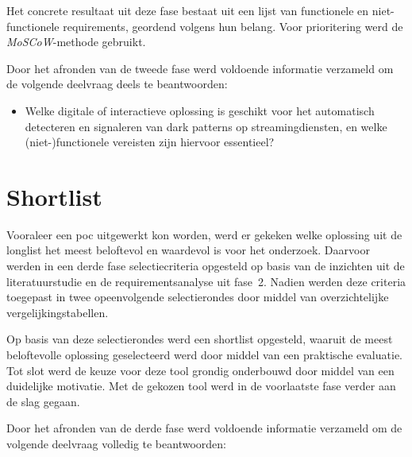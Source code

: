 \vspace{1em}

Het concrete resultaat uit deze fase bestaat uit een lijst van functionele en niet-functionele requirements, geordend volgens hun belang. Voor prioritering werd de \emph{MoSCoW}-methode gebruikt.

\vspace{1em}

Door het afronden van de tweede fase werd voldoende informatie verzameld om de volgende deelvraag deels te beantwoorden:

\begin{itemize}
    \item Welke digitale of interactieve oplossing is geschikt voor het automatisch detecteren en signaleren van dark patterns op streamingdiensten, en welke (niet-)functionele vereisten zijn hiervoor essentieel?
\end{itemize}

\vspace{1em}

\section{Shortlist}
\label{sec:shortlist}

\vspace{1em}

Vooraleer een \acrlong{poc} uitgewerkt kon worden, werd er gekeken welke oplossing uit de longlist het meest beloftevol en waardevol is voor het onderzoek. Daarvoor werden in een derde fase selectiecriteria opgesteld op basis van de inzichten uit de literatuurstudie en de requirementsanalyse uit fase~2. Nadien werden deze criteria toegepast in twee opeenvolgende selectierondes door middel van overzichtelijke vergelijkingstabellen.

\vspace{1em}

Op basis van deze selectierondes werd een shortlist opgesteld, waaruit de meest beloftevolle oplossing geselecteerd werd door middel van een praktische evaluatie. Tot slot werd de keuze voor deze tool grondig onderbouwd door middel van een duidelijke motivatie. Met de gekozen tool werd in de voorlaatste fase verder aan de slag gegaan.

\vspace{1em}

Door het afronden van de derde fase werd voldoende informatie verzameld om de volgende deelvraag volledig te beantwoorden:

